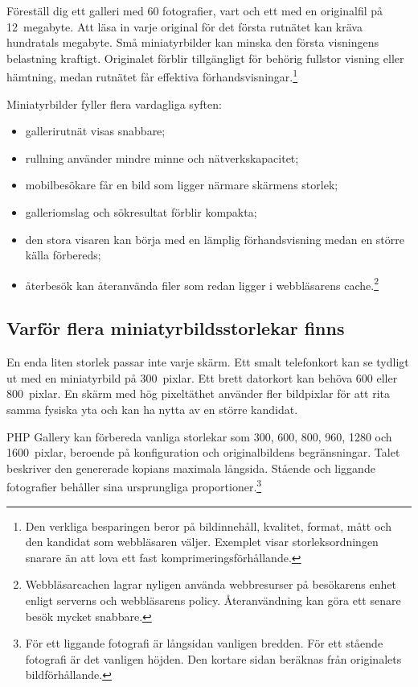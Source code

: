 \documentclass[11pt,a4paper]{article}
\begin{document}
Föreställ dig ett galleri med 60 fotografier, vart och ett med en originalfil på
12~megabyte. Att läsa in varje original för det första rutnätet kan kräva
hundratals megabyte. Små miniatyrbilder kan minska den första visningens
belastning kraftigt. Originalet förblir tillgängligt för behörig fullstor
visning eller hämtning, medan rutnätet får effektiva
förhandsvisningar.\footnote{Den verkliga besparingen beror på bildinnehåll,
kvalitet, format, mått och den kandidat som webbläsaren väljer. Exemplet visar
storleksordningen snarare än att lova ett fast komprimeringsförhållande.}

Miniatyrbilder fyller flera vardagliga syften:

\begin{itemize}
  \item gallerirutnät visas snabbare;
  \item rullning använder mindre minne och nätverkskapacitet;
  \item mobilbesökare får en bild som ligger närmare skärmens storlek;
  \item galleriomslag och sökresultat förblir kompakta;
  \item den stora visaren kan börja med en lämplig förhandsvisning medan en
  större källa förbereds;
  \item återbesök kan återanvända filer som redan ligger i webbläsarens
  cache.\footnote{Webbläsarcachen lagrar nyligen använda webbresurser på
  besökarens enhet enligt serverns och webbläsarens policy. Återanvändning kan
  göra ett senare besök mycket snabbare.}
\end{itemize}

\subsection{Varför flera miniatyrbildsstorlekar finns}

En enda liten storlek passar inte varje skärm. Ett smalt telefonkort kan se
tydligt ut med en miniatyrbild på 300~pixlar. Ett brett datorkort kan behöva 600
eller 800~pixlar. En skärm med hög pixeltäthet använder fler bildpixlar för att
rita samma fysiska yta och kan ha nytta av en större kandidat.

PHP Gallery kan förbereda vanliga storlekar som 300, 600, 800, 960, 1280 och
1600~pixlar, beroende på konfiguration och originalbildens begränsningar. Talet
beskriver den genererade kopians maximala långsida. Stående och liggande
fotografier behåller sina ursprungliga proportioner.\footnote{För ett liggande
fotografi är långsidan vanligen bredden. För ett stående fotografi är det
vanligen höjden. Den kortare sidan beräknas från originalets bildförhållande.}
\end{document}
